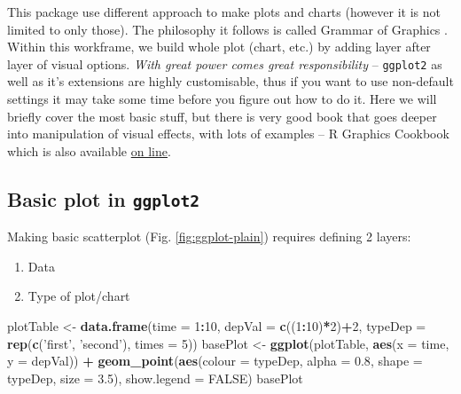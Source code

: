 \documentclass[]{book}
\newenvironment{Shaded}{\begin{snugshade}}{\end{snugshade}}
\newcommand{\KeywordTok}[1]{\textcolor[rgb]{0.13,0.29,0.53}{\textbf{#1}}}
\newcommand{\DataTypeTok}[1]{\textcolor[rgb]{0.13,0.29,0.53}{#1}}
\newcommand{\DecValTok}[1]{\textcolor[rgb]{0.00,0.00,0.81}{#1}}
\newcommand{\FloatTok}[1]{\textcolor[rgb]{0.00,0.00,0.81}{#1}}
\newcommand{\StringTok}[1]{\textcolor[rgb]{0.31,0.60,0.02}{#1}}
\newcommand{\OtherTok}[1]{\textcolor[rgb]{0.56,0.35,0.01}{#1}}
\newcommand{\OperatorTok}[1]{\textcolor[rgb]{0.81,0.36,0.00}{\textbf{#1}}}
\newcommand{\NormalTok}[1]{#1}
\providecommand{\tightlist}{%
  \setlength{\itemsep}{0pt}\setlength{\parskip}{0pt}}
\theoremstyle{definition}
\theoremstyle{definition}
\theoremstyle{definition}
\theoremstyle{remark}
\begin{document}
This package use different approach to make plots and charts (however it
is not limited to only those). The philosophy it follows is called
Grammar of Graphics \citep{wilkinson2005, layered-grammar}. Within this
workframe, we build whole plot (chart, etc.) by adding layer after layer
of visual options. \emph{With great power comes great responsibility} --
\texttt{ggplot2} as well as it's extensions are highly customisable,
thus if you want to use non-default settings it may take some time
before you figure out how to do it. Here we will briefly cover the most
basic stuff, but there is very good book that goes deeper into
manipulation of visual effects, with lots of examples -- R Graphics
Cookbook \citep{chang2013} which is also available
\href{http://www.cookbook-r.com/Graphs/}{on line}.

\subsection{\texorpdfstring{Basic plot in
\texttt{ggplot2}}{Basic plot in ggplot2}}\label{basic-plot-in-ggplot2}

Making basic scatterplot (Fig. \ref{fig:ggplot-plain}) requires defining
2 layers:

\begin{enumerate}
\def\labelenumi{\arabic{enumi}.}
\tightlist
\item
  Data
\item
  Type of plot/chart
\end{enumerate}

\begin{Shaded}
\begin{Highlighting}[]
\NormalTok{plotTable <-}\StringTok{ }\KeywordTok{data.frame}\NormalTok{(}\DataTypeTok{time =} \DecValTok{1}\OperatorTok{:}\DecValTok{10}\NormalTok{,}
                        \DataTypeTok{depVal =} \KeywordTok{c}\NormalTok{((}\DecValTok{1}\OperatorTok{:}\DecValTok{10}\NormalTok{)}\OperatorTok{*}\DecValTok{2}\NormalTok{)}\OperatorTok{+}\DecValTok{2}\NormalTok{,}
                        \DataTypeTok{typeDep =} \KeywordTok{rep}\NormalTok{(}\KeywordTok{c}\NormalTok{(}\StringTok{'first'}\NormalTok{, }\StringTok{'second'}\NormalTok{), }\DataTypeTok{times =} \DecValTok{5}\NormalTok{))}
\NormalTok{basePlot <-}\StringTok{ }\KeywordTok{ggplot}\NormalTok{(plotTable, }\KeywordTok{aes}\NormalTok{(}\DataTypeTok{x =}\NormalTok{ time, }\DataTypeTok{y =}\NormalTok{ depVal)) }\OperatorTok{+}
\StringTok{  }\KeywordTok{geom_point}\NormalTok{(}\KeywordTok{aes}\NormalTok{(}\DataTypeTok{colour =}\NormalTok{ typeDep, }\DataTypeTok{alpha =} \FloatTok{0.8}\NormalTok{, }\DataTypeTok{shape =}\NormalTok{ typeDep, }\DataTypeTok{size =} \FloatTok{3.5}\NormalTok{),}
             \DataTypeTok{show.legend =} \OtherTok{FALSE}\NormalTok{)}
\NormalTok{basePlot}
\end{Highlighting}
\end{Shaded}
\end{document}
